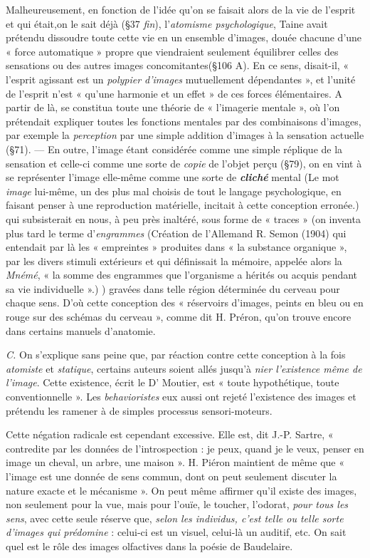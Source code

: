 Malheureusement, en fonction de l’idée qu’on se faisait alors de la
vie de l’esprit et qui était,on le sait déjà (\S 37 {\it fin}), l’{\it atomisme psychologique},
Taine avait prétendu dissoudre toute cette vie en un ensemble
d'images, douée chacune d’une « force automatique » propre que
viendraient seulement équilibrer celles des sensations ou des autres
images concomitantes(\S 106 A). En ce sens, disait-il, « l’esprit agissant
est un {\it polypier d'images} mutuellement dépendantes », et l’unité de
l'esprit n’est « qu’une harmonie et un effet » de ces forces élémentaires.
A partir de là, se constitua toute une théorie de « l'imagerie mentale »,
où l’on prétendait expliquer toutes les fonctions mentales par des
combinaisons d'images, par exemple la {\it perception} par une simple
addition d'images à la sensation actuelle (\S71). — En outre, l’image
étant considérée comme une simple réplique de la sensation et celle-ci
comme une sorte de {\it copie} de l’objet perçu (\S 79), on en vint à se
représenter l’image elle-même comme une sorte de \textbf{\textit {cliché}} mental
{\scriptsize (Le mot {\it image} lui-même, un des plus mal choisis de tout le langage psychologique,
en faisant penser à une reproduction matérielle, incitait à cette conception erronée.)}
qui subsisterait en nous, à peu près inaltéré, sous forme de « traces » (on
inventa plus tard le terme d’{\it engrammes}
{\scriptsize (Création de l'Allemand R. Semon (1904) qui entendait par là les « empreintes »
produites dans « la substance organique », par les divers stimuli extérieurs et qui
définissait la mémoire, appelée alors la {\it Mnémé}, « la somme des engrammes que
l'organisme a hérités ou acquis pendant sa vie individuelle ».)}
) gravées dans telle région
déterminée du cerveau pour chaque sens. D’où cette conception des
« réservoirs d'images, peints en bleu ou en rouge sur des schémas du
cerveau », comme dit H. Préron, qu’on trouve encore dans certains
manuels d'anatomie.

{\it C.} On s’explique sans peine que, par réaction contre cette conception
à la fois {\it atomiste} et {\it statique}, certains auteurs soient allés jusqu’à
{\it nier l'existence même de l’image}. Cette existence, écrit le D' Moutier,
est « toute hypothétique, toute conventionnelle ». Les {\it behavioristes}
eux aussi ont rejeté l’existence des images et prétendu les ramener
à de simples processus sensori-moteurs.

Cette négation radicale est cependant excessive. Elle est, dit
J.-P. Sartre, « contredite par les données de l’introspection : je
peux, quand je le veux, penser en image un cheval, un arbre, une
maison ». H. Piéron maintient de même que « l’image est une donnée
de sens commun, dont on peut seulement discuter la nature exacte
et le mécanisme ». On peut même affirmer qu’il existe des images,
non seulement pour la vue, mais pour l’ouïe, le toucher, l’odorat,
{\it pour tous les sens}, avec cette seule réserve que, {\it selon les individus,
c’est telle ou telle sorte d'images qui prédomine} : celui-ci est un visuel,
celui-là un auditif, etc. On sait quel est le rôle des images olfactives
dans la poésie de Baudelaire.

